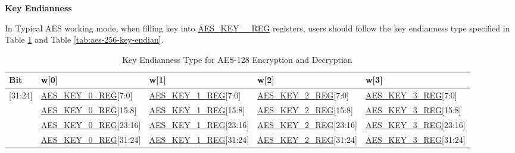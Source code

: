 \documentclass[main\_\_EN.tex]{subfiles}
\begin{document}

\begin{landscape}


\textbf{Key Endianness}

In Typical AES working mode, 
when filling key into \hyperref[regdesc:AESKEYnREG]{AES\_KEY\_\_REG} registers, users should follow the key endianness type specified in Table \ref{tab:aes-128-key-endian} and Table \ref{tab:aes-256-key-endian}.

\begin{table}[H]
    \centering
    \caption{Key Endianness Type for AES-128 Encryption and Decryption}
    \label{tab:aes-128-key-endian}

    \begin{threeparttable}
    \begin{tabular}{ |l|l|l|l|l| }
    \hline
        \rowcolor{lightgray}
        \textbf{Bit}\tnote{1} &   \textbf{w[0]}    &  \textbf{w[1]}    &   \textbf{w[2]}    &   \textbf{w[3]}\tnote{2}     \\\hline
        
        [31:24]     &   \hyperref[regdesc:AESKEYnREG]{AES\_KEY\_0\_REG}[7:0]    &   \hyperref[regdesc:AESKEYnREG]{AES\_KEY\_1\_REG}[7:0]    &   \hyperref[regdesc:AESKEYnREG]{AES\_KEY\_2\_REG}[7:0]    &   \hyperref[regdesc:AESKEYnREG]{AES\_KEY\_3\_REG}[7:0]\\ \hline
        [23:16]     &   \hyperref[regdesc:AESKEYnREG]{AES\_KEY\_0\_REG}[15:8]   &   \hyperref[regdesc:AESKEYnREG]{AES\_KEY\_1\_REG}[15:8]   &   \hyperref[regdesc:AESKEYnREG]{AES\_KEY\_2\_REG}[15:8]   &   \hyperref[regdesc:AESKEYnREG]{AES\_KEY\_3\_REG}[15:8]\\ \hline
        [15:8]  &   \hyperref[regdesc:AESKEYnREG]{AES\_KEY\_0\_REG}[23:16]  &   \hyperref[regdesc:AESKEYnREG]{AES\_KEY\_1\_REG}[23:16]  &   \hyperref[regdesc:AESKEYnREG]{AES\_KEY\_2\_REG}[23:16]  &   \hyperref[regdesc:AESKEYnREG]{AES\_KEY\_3\_REG}[23:16]\\ \hline
        [7:0]   &   \hyperref[regdesc:AESKEYnREG]{AES\_KEY\_0\_REG}[31:24]  &   \hyperref[regdesc:AESKEYnREG]{AES\_KEY\_1\_REG}[31:24]  & \hyperref[regdesc:AESKEYnREG]{AES\_KEY\_2\_REG}[31:24]    &   \hyperref[regdesc:AESKEYnREG]{AES\_KEY\_3\_REG}[31:24]\\ \hline
        \end{tabular}


\end{threeparttable}
\end{table}
\end{landscape}
\end{document}

